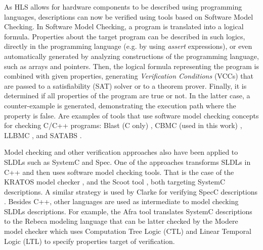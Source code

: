 As HLS allows for hardware components to be described using programming languages,
descriptions can now be verified using tools based on Software Model Checking.
In Software Model Checking, a program is translated into a logical formula.
Properties about the target program can be described in such logics,
directly in the programming language (e.g. by using \emph{assert} expressions),
or even automatically generated by analyzing constructions of the programming
language, such as arrays and pointers.
Then, the logical formula representing the program is combined with given properties,
generating \emph{Verification Conditions} (VCCs) that are passed to a
satisfiability (SAT) solver or to a theorem prover.
Finally, it is determined if all properties of the program are true or not.
In the latter case, a counter-example is generated, demonstrating the execution
path where the property is false.
Are examples of tools that use software model checking concepts for checking C/C++
programs:
Blast (C only) \cite{Henzinger:Blast},
CBMC (used in this work) \cite{Kroehning:CBMC},
LLBMC \cite{Sinz:LLBMC},
and SATABS \cite{Kroening:SATABS}.

%
% 

Model checking and other verification approaches also have been applied to
SLDLs such as SystemC and Spec.
One of the approaches transforms SLDLs in C++ and then uses software
model checking tools.
That is the case of the KRATOS model checker \cite{Cimatti:2011}, and the Scoot
tool \cite{Blanc:2008}, both targeting SystemC descriptions.
A similar strategy is used by Clarke for verifying SpecC descriptions
\cite{Clarke:2007}.
%
% 
Besides C++, other languages are used as intermediate to model checking SLDLs
descriptions.
For example, the Afra tool \cite{Razavi:2011}
translates SystemC descriptions to the
Rebeca modeling language
that can be latter checked by the Modere
model checker which uses
Computation Tree Logic (CTL) and
Linear Temporal Logic (LTL)
to specify properties target of verification.
%
%

